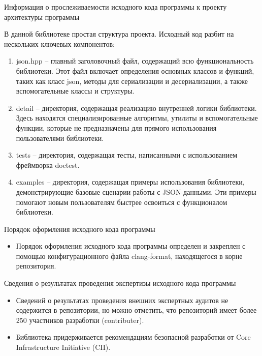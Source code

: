 \documentclass[10pt]{beamer}
\begin{document}
\begin{frame}{Информация о прослеживаемости исходного кода программы к проекту архитектуры программы}

    В данной библиотеке простая структура проекта. Исходный код разбит на нескольких ключевых компонентов:

    \begin{enumerate}
        \item json.hpp -- главный заголовочный файл, содержащий всю функциональность библиотеки. Этот файл включает определения основных классов и функций, таких как класс json, методы для сериализации и десериализации, а также вспомогательные классы и структуры.
        \item detail -- директория, содержащая реализацию внутренней логики библиотеки. Здесь находятся специализированные алгоритмы, утилиты и вспомогательные функции, которые не предназначены для прямого использования пользователями библиотеки.
        \item tests -- директория, содержащая тесты, написанными с использованием фреймворка doctest.
        \item examples -- директория, содержащая примеры использования библиотеки, демонстрирующие базовые сценарии работы с JSON-данными. Эти примеры помогают новым пользователям быстрее освоиться с функционалом библиотеки.
    \end{enumerate}

\end{frame}

\begin{frame}{Порядок оформления исходного кода программы}
    \begin{itemize}
        \item Порядок оформления исходного кода программы определен и закреплен с помощью конфигурационного файла clang-format, находящегося в корне репозитория.
    \end{itemize}
\end{frame}

\begin{frame}{Сведения о результатах проведения экспертизы исходного кода программы}
    \begin{itemize}
        \item Сведений о результатах проведения внешних экспертных аудитов не содержится в репозитории, но можно отметить, что репозиторий имеет более 250 участников разработки (contributer).
        \item Библиотека придерживается рекомендациям безопасной разработки от Core Infrastructure Initiative (CII).
    \end{itemize}
\end{frame}
\end{document}
